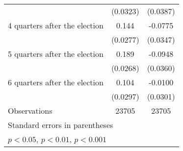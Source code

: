\begin{table}[htbp]
\begin{tabular}{l*{2}{c}}
                    &    (0.0323)         &    (0.0387)         \\
[1em]
 4 quarters after the election&       0.144\sym{***}&     -0.0775\sym{*}  \\
                    &    (0.0277)         &    (0.0347)         \\
[1em]
 5 quarters after the election&       0.189\sym{***}&     -0.0948\sym{**} \\
                    &    (0.0268)         &    (0.0360)         \\
[1em]
 6 quarters after the election&       0.104\sym{***}&     -0.0100         \\
                    &    (0.0297)         &    (0.0301)         \\
\hline
Observations        &       23705         &       23705         \\
\hline\hline
\multicolumn{3}{l}{\footnotesize Standard errors in parentheses}\\
\multicolumn{3}{l}{\footnotesize \sym{*} \(p<0.05\), \sym{**} \(p<0.01\), \sym{***} \(p<0.001\)}\\
\end{tabular}
\end{table}
